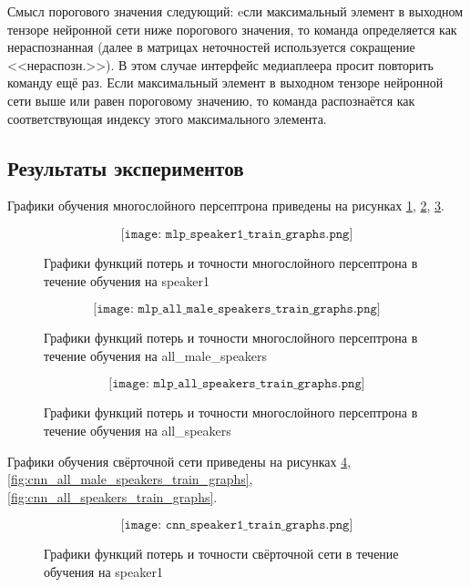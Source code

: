 Смысл порогового значения следующий: eсли максимальный элемент в выходном тензоре нейронной сети ниже порогового значения, то команда определяется как нераспознанная (далее в матрицах неточностей используется сокращение <<нераспозн.>>). В этом случае интерфейс медиаплеера просит повторить команду ещё раз. Если максимальный элемент в выходном тензоре нейронной сети выше или равен пороговому значению, то команда распознаётся как соответствующая индексу этого максимального элемента. 

\newpage
\subsection{Результаты экспериментов}
Графики обучения многослойного персептрона приведены на рисунках \ref{fig:mlp_speaker1_train_graphs}, \ref{fig:mlp_all_male_speakers_train_graphs}, \ref{fig:mlp_all_speakers_train_graphs}.

\begin{figure}[H]
	\[\texttt{[image: mlp\_speaker1\_train\_graphs.png]}\]
	\caption{Графики функций потерь и точности многослойного персептрона в течение обучения на speaker1}
	\label{fig:mlp_speaker1_train_graphs}
\end{figure}

\begin{figure}[H]
	\[\texttt{[image: mlp\_all\_male\_speakers\_train\_graphs.png]}\]
	\caption{Графики функций потерь и точности многослойного персептрона в течение обучения на all\_male\_speakers}
	\label{fig:mlp_all_male_speakers_train_graphs}
\end{figure}

\begin{figure}[H]
	\[\texttt{[image: mlp\_all\_speakers\_train\_graphs.png]}\]
	\caption{Графики функций потерь и точности многослойного персептрона в течение обучения на all\_speakers}
	\label{fig:mlp_all_speakers_train_graphs}
\end{figure}


Графики обучения свёрточной сети приведены на рисунках \ref{fig:cnn_speaker1_train_graphs}, \ref{fig:cnn_all_male_speakers_train_graphs}, \ref{fig:cnn_all_speakers_train_graphs}.

\begin{figure}[H]
	\[\texttt{[image: cnn\_speaker1\_train\_graphs.png]}\]
	\caption{Графики функций потерь и точности свёрточной сети в течение обучения на speaker1}
	\label{fig:cnn_speaker1_train_graphs}
\end{figure}

